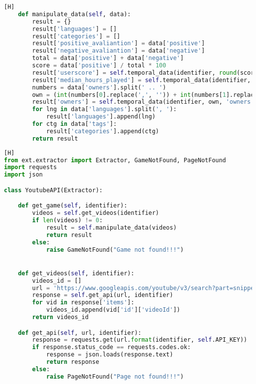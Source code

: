 \begin{anexosenv}
\begin{lstlisting}[language={Python}, caption = {Código do \textit{plugin} \textit{\textbf{Steam Spy API}}}] [H]
	def manipulate_data(self, data):
		result = {}
		result['languages'] = []
		result['categories'] = []
		result['positive_avaliantion'] = data['positive']
		result['negative_avaliantion'] = data['negative']
		total = data['positive'] + data['negative']
		score = data['positive'] / total * 100
		result['userscore'] = self.temporal_data(identifier, round(score, 2), 'userscore')
		result['median_hours_played'] = self.temporal_data(identifier, data['median_forever'] // 60, 'median_hours_played')
		numbers = data['owners'].split(' .. ')
		own = (int(numbers[0].replace(',', '')) + int(numbers[1].replace(',', ''))) // 2
		result['owners'] = self.temporal_data(identifier, own, 'owners')
		for lng in data['languages'].split(', '):
			result['languages'].append(lng)
		for ctg in data['tags']:
			result['categories'].append(ctg)
		return result
\end{lstlisting}
\begin{lstlisting}[language={Python}, caption = {Código do \textit{plugin} \textit{\textbf{Youtube API}}}] [H]
from ext.extractor import Extractor, GameNotFound, PageNotFound
import requests
import json

class YoutubeAPI(Extractor):

	def get_game(self, identifier):
		videos = self.get_videos(identifier)
		if len(videos) != 0:
			result = self.manipulate_data(videos)
			return result
		else:
			raise GameNotFound("Game not found!!!")


	def get_videos(self, identifier):	
		videos_id = []
		url = 'https://www.googleapis.com/youtube/v3/search?part=snippet&maxResults=20&q={}&type=video&key={}&order=relevance'
		response = self.get_api(url, identifier)
		for vid in response['items']:
			videos_id.append(vid['id']['videoId'])
		return videos_id

	def get_api(self, url, identifier):
		response = requests.get(url.format(identifier, self.API_KEY))
		if response.status_code == requests.codes.ok:
			response = json.loads(response.text)
			return response
		else:
			raise PageNotFound("Page not found!!!")


\end{lstlisting}
\end{anexosenv}
